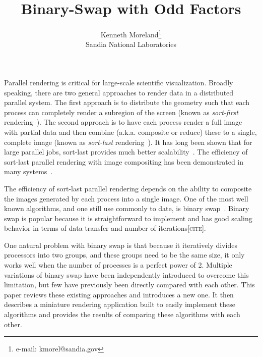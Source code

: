 \documentclass{vgtc}                          %
\title{Binary-Swap with Odd Factors}
\author{
  Kenneth Moreland\thanks{e-mail: kmorel@sandia.gov}\\
  \scriptsize Sandia National Laboratories
}
\newcommand*{\lcite}[1]{~\cite{#1}}
\newcommand*{\keyterm}[1]{\emph{#1}}
\newcommand{\fix}[1]{{\color{red}\textsc{[#1]}}}
\newcommand{\textalgorithm}[1]{\textsf{#1}\xspace}
\newcommand{\binaryswap}{\textalgorithm{binary swap}}
\newcommand{\Binaryswap}{\textalgorithm{Binary swap}}
\begin{document}


\maketitle

Parallel rendering is critical for large-scale scientific visualization.
Broadly speaking, there are two general approaches to render data in a distributed parallel system.
The first approach is to distribute the geometry such that each process can completely render a subregion of the screen (known as \keyterm{sort-first} rendering\lcite{Molnar1994}).
The second approach is to have each process render a full image with partial data and then combine (a.k.a. composite or reduce) these to a single, complete image (known as \keyterm{sort-last} rendering\lcite{Molnar1994}).
It has long been shown that for large parallel jobs, sort-last provides much better scalability\lcite{Wylie2001}.
The efficiency of sort-last parallel rendering with image compositing has been demonstrated in many systems\lcite{Childs2010,Moreland2011:SC,Peterka2009:ICPP,Peterka2013}.

The efficiency of sort-last parallel rendering depends on the ability to composite the images generated by each process into a single image.
One of the most well known algorithms, and one still use commonly to date, is \binaryswap\lcite{BinarySwap1}.
\Binaryswap is popular because it is straightforward to implement and has good scaling behavior in terms of data transfer and number of iterations\fix{cite}.

One natural problem with \binaryswap is that because it iteratively divides processors into two groups, and these groups need to be the same size, it only works well when the number of processes is a perfect power of 2.
Multiple variations of \binaryswap have been independently introduced to overcome this limitation, but few have previously been directly compared with each other.
This paper reviews these existing approaches and introduces a new one.
It then describes a miniature rendering application built to easily implement these algorithms and provides the results of comparing these algorithms with each other.
\end{document}

